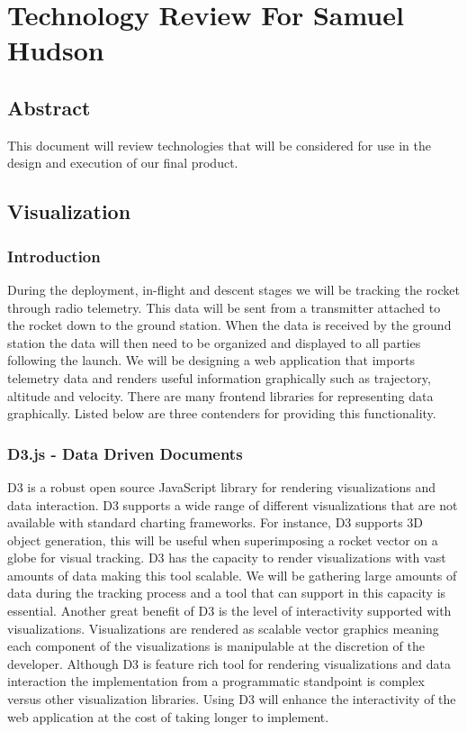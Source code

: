 \documentclass[onecolumn, draftclsnofoot,10pt, compsoc]{IEEEtran}
\begin{document}
\section{Technology Review For Samuel Hudson}
\subsection{Abstract}
This document will review technologies that will be considered for use in the design and execution of our final product.
\subsection{Visualization}
\subsubsection{Introduction}
During the deployment, in-flight and descent stages we will be tracking the rocket through radio telemetry. This data will be sent from a transmitter attached to the rocket down to the ground station. When the data is received by the ground station the data will then need to be organized and displayed to all parties following the launch. We will be designing a web application that imports telemetry data and renders useful information graphically such as trajectory, altitude and velocity. There are many frontend libraries for representing data graphically. Listed below are three contenders for providing this functionality. 
\subsubsection{D3.js - Data Driven Documents}
D3 is a robust open source JavaScript library for rendering visualizations and data interaction. D3 supports a wide range of different visualizations that are not available with standard charting frameworks. For instance, D3 supports 3D object generation, this will be useful when superimposing a rocket vector on a globe for visual tracking. D3 has the capacity to render visualizations with vast amounts of data making this tool scalable. We will be gathering large amounts of data during the tracking process and a tool that can support in this capacity is essential. Another great benefit of D3 is the level of interactivity supported with visualizations. Visualizations are rendered as scalable vector graphics meaning each component of the visualizations is manipulable at the discretion of the developer. Although D3 is feature rich tool for rendering visualizations and data interaction the implementation from a programmatic standpoint is complex versus other visualization libraries. Using D3 will enhance the interactivity  of the web application at the cost of taking longer to implement. 
\end{document}
